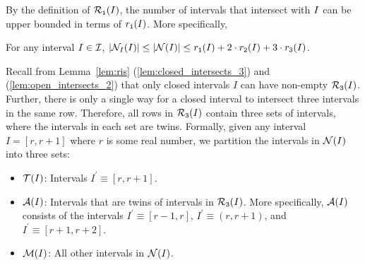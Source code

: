 By the definition of $\mathcal{R}_\texttt{i}(I)$, the number of intervals that intersect with $I$ can be upper bounded in terms of $r_\texttt{i}(I)$. More specifically,

\begin{observation}
    \label{obs:r_i=N}
    For any interval $I \in \mathcal{I}$, $|\mathcal{N}_I(I)| \leq |\mathcal{N}(I)| \leq r_\texttt{\texttt{1}}(I) + 2\cdot r_\texttt{\texttt{2}}(I) + 3\cdot r_\texttt{\texttt{3}}(I)$.
\end{observation}

Recall from Lemma~\ref{lem:ris} (\ref{lem:closed_intersects_3}) and (\ref{lem:open_intersects_2}) that only closed intervals $I$ can have non-empty $\mathcal{R}_\texttt{3}(I)$. 
Further, there is only a single way for a closed interval to intersect three intervals in the same row. 
Therefore, all rows in $\mathcal{R}_\texttt{3}(I)$ contain three sets of intervals, where the intervals in each set are twins.
Formally, given any interval $I = [r, r+1]$ where $r$ is some real number, we partition the intervals in $\mathcal{N}(I)$ into three sets:
\begin{itemize}
    \item $\mathcal{T}(I)$: Intervals $I^\prime \equiv [r, r+1]$.
    
    \item $\mathcal{A}(I)$: Intervals that are twins of intervals in $\mathcal{R}_\texttt{3}(I)$. More specifically, $\mathcal{A}(I)$ consists of the intervals $I^\prime \equiv [r-1, r]$, $I^\prime \equiv (r, r+1)$, and $I^\prime \equiv [r+1, r+2]$.
    
    \item $\mathcal{M}(I)$: All other intervals in $\mathcal{N}(I)$.
\end{itemize}
